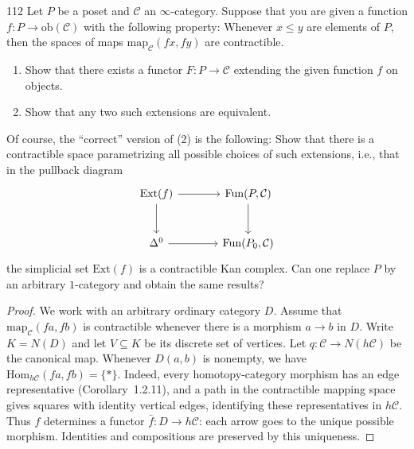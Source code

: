 \begin{exercise}{112}
Let $P$ be a poset and $\mathcal C$ an $\infty$-category. Suppose that you are given a function
$f\colon P\to\mathrm{ob}(\mathcal C)$ with the following property: Whenever $x\le y$ are elements
of $P$, then the spaces of maps $\mathrm{map}_{\mathcal C}(fx,fy)$ are contractible.
\begin{enumerate}[label=(\arabic*)]
 \item Show that there exists a functor $F\colon P\to\mathcal C$ extending the given function $f$
       on objects.
 \item Show that any two such extensions are equivalent.
\end{enumerate}
Of course, the ``correct'' version of (2) is the following: Show that there is a contractible space
parametrizing all possible choices of such extensions, i.e., that in the pullback diagram
\[
\begin{tikzcd}[column sep=large,row sep=large]
 \mathrm{Ext}(f)\arrow[r]\arrow[d] & \mathrm{Fun}(P,\mathcal C)\arrow[d] \\
 \Delta^0\arrow[r] & \mathrm{Fun}(P_0,\mathcal C)
\end{tikzcd}
\]
the simplicial set $\mathrm{Ext}(f)$ is a contractible Kan complex. Can one replace $P$ by an arbitrary
$1$-category and obtain the same results?

\begin{proof}
We work with an arbitrary ordinary category $D$.
Assume that $\mathrm{map}_{\mathcal C}(fa,fb)$ is contractible whenever
there is a morphism $a\to b$ in $D$.
Write $K=N(D)$ and let $V\subseteq K$ be its discrete set of vertices.
Let $q\colon\mathcal C\to N(h\mathcal C)$ be the canonical map.
Whenever $D(a,b)$ is nonempty, we have
$\mathrm{Hom}_{h\mathcal C}(fa,fb)=\{*\}$.
Indeed, every homotopy-category morphism has an edge representative
(Corollary~1.2.11), and a path in the contractible mapping space gives
squares with identity vertical edges, identifying these representatives
in $h\mathcal C$.
Thus $f$ determines a functor $\bar f\colon D\to h\mathcal C$:
each arrow goes to the unique possible morphism.
Identities and compositions are preserved by this uniqueness.


\end{proof}
\end{exercise}
